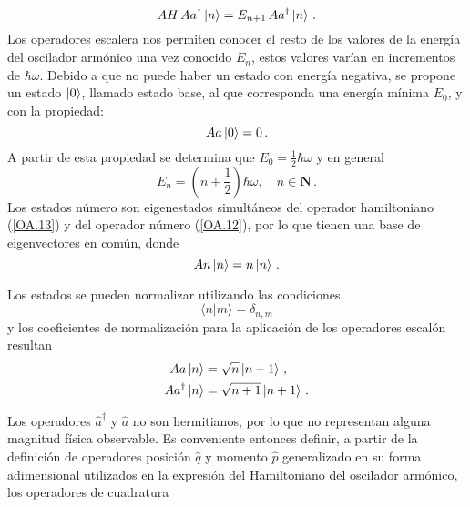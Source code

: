 \begin{equation}
  \label{OA.16}
  A{H} \,A{a}^{\dagger}\ket{n} = E_{n+1}\, A{a}^{\dagger}\ket{n}\,.
\end{equation}
Los operadores escalera nos permiten conocer el resto de los valores de la energía del oscilador armónico una vez conocido $E_n$, estos valores varían en incrementos de $\hbar\omega$. Debido a que no puede haber un estado con energía negativa, se propone un estado $\ket{0}$, llamado estado base, al que corresponda una energía mínima $E_0$, y con la propiedad:
\begin{equation}
  \label{OA.17}
  A{a}\ket{0} = 0\,.
\end{equation}
A partir de esta propiedad se determina que $E_0 = \frac{1}{2}\hbar\omega$ y en general
\begin{equation}
  \label{OA.18}
  E_n = \left( n + \frac{1}{2} \right) \hbar\omega, \quad n\in\mathbf{N}\,.
\end{equation}
Los estados número son eigenestados simultáneos del operador hamiltoniano (\ref{OA.13}) y del operador número (\ref{OA.12}), por lo que tienen una base de eigenvectores en común, donde
\begin{equation}
  \label{OA.19}
  A{n}\ket{n} = n\ket{n}\,.
\end{equation}

Los estados se pueden normalizar utilizando las condiciones
\begin{equation}
  \label{OA.20}
  \langle n\vert m\rangle = \delta_{n,m}
\end{equation}
y los coeficientes de normalización para la aplicación de los operadores escalón resultan
\begin{align}
  A{a}\ket{n}           & = \sqrt{n} \ket{n-1} \,,\label{OA.21}   \\
  A{a}^{\dagger}\ket{n} & = \sqrt{n+1} \ket{n+1} \,.\label{OA.22}
\end{align}

Los operadores $\hat{a}^{\dagger}$ y $\hat{a}$ no son hermitianos, por lo que no representan alguna magnitud f\'isica observable. Es conveniente entonces definir, a partir de la definición de operadores posición $\hat{q}$ y momento $\hat{p}$ generalizado en su forma adimensional utilizados en la expresión del Hamiltoniano del oscilador armónico, los operadores de cuadratura \cite{Loudon}

